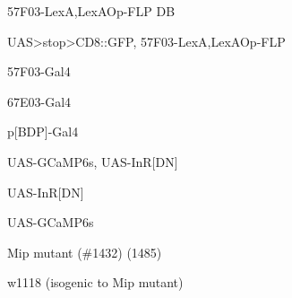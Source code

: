 \documentclass[17pt]{extarticle}
\begin{document}
\newpage\vspace*{-0.15cm}
\begin{footnotesize}
57F03-LexA,LexAOp-FLP DB \\[0.5em]
\end{footnotesize}
\footnotesize
\newpage\vspace*{-0.15cm}
\begin{scriptsize}
UAS>stop>CD8::GFP, 57F03-LexA,LexAOp-FLP \\[0.5em]
\end{scriptsize}
\footnotesize
\newpage\vspace*{-0.15cm}
\begin{large}
57F03-Gal4 \\[0.5em]
\end{large}
\footnotesize
\newpage\vspace*{-0.15cm}
\begin{large}
67E03-Gal4 \\[0.5em]
\end{large}
\footnotesize
\newpage\vspace*{-0.15cm}
\begin{normalsize}
p[BDP]-Gal4 \\[0.5em]
\end{normalsize}
\footnotesize
\newpage\vspace*{-0.15cm}
\begin{footnotesize}
UAS-GCaMP6s, UAS-InR[DN] \\[0.5em]
\end{footnotesize}
\footnotesize
\newpage\vspace*{-0.15cm}
\begin{normalsize}
UAS-InR[DN] \\[0.5em]
\end{normalsize}
\footnotesize
\newpage\vspace*{-0.15cm}
\begin{normalsize}
UAS-GCaMP6s \\[0.5em]
\end{normalsize}
\footnotesize
\newpage\vspace*{-0.15cm}
\begin{footnotesize}
Mip mutant (\#1432) (1485) \\[0.5em]
\end{footnotesize}
\footnotesize
\newpage\vspace*{-0.15cm}
\begin{footnotesize}
w1118 (isogenic to Mip mutant) \\[0.5em]
\end{footnotesize}
\end{document}
